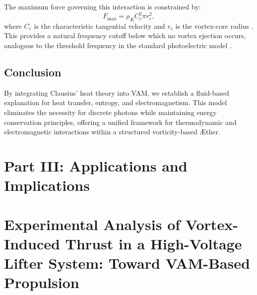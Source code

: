 \documentclass[a4paper,12pt]{article}
\begin{document}
    The maximum force governing this interaction is constrained by:
    \begin{equation}
        F_{\max} = \rho_\text{\AE} C_e^2 \pi r_c^2,
    \end{equation}
    where $C_e$ is the characteristic tangential velocity and $r_c$ is the vortex-core radius \cite{vam2025unified}. This provides a natural frequency cutoff below which no vortex ejection occurs, analogous to the threshold frequency in the standard photoelectric model \cite{einstein1905photoelectric}.

    \subsection{Conclusion}

    By integrating Clausius' heat theory into VAM, we establish a fluid-based explanation for heat transfer, entropy, and electromagnetism. This model eliminates the necessity for discrete photons while maintaining energy conservation principles, offering a unified framework for thermodynamic and electromagnetic interactions within a structured vorticity-based Æther.



    \newpage \section*{Part III: Applications and Implications}\label{sec:Part-3} %



\section{\textbf{Experimental Analysis of Vortex-Induced Thrust in a High-Voltage Lifter System: Toward VAM-Based Propulsion}}


\begin{abstract}
    We report and analyze a high-voltage asymmetric capacitor experiment exhibiting thrust far beyond that explainable by electrohydrodynamics (EHD). Using a Cockcroft–Walton voltage multiplier generating up to 30kV and microampere-scale current, we observe stable, polarity-symmetric thrust scaling with voltage. The results show strong agreement with predictions of the Vortex Æther Model (VAM), which interprets the thrust as arising from pressure gradients induced by structured Ætheric vorticity. We present experimental details, time-resolved breakdown cycles, energy input vs. output analysis, and a predictive VAM thrust formulation consistent with observations.
\end{abstract}
\end{document}
